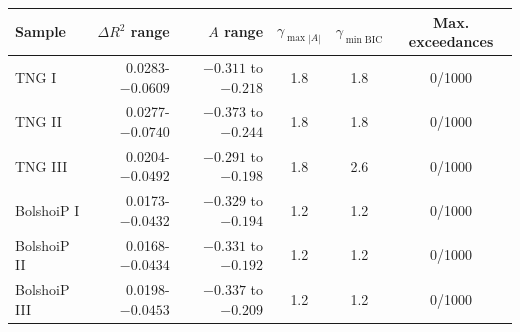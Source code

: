 \begin{tabular}{lrrccc}
\toprule
Sample & $\Delta R^2$ range & $A$ range & $\gamma_{\max|A|}$ & $\gamma_{\min\mathrm{BIC}}$ & Max. exceedances \\
\midrule
TNG I & 0.0283-$-0.0609$ & $-0.311$ to $-0.218$ & 1.8 & 1.8 & 0/1000 \\
TNG II & 0.0277-$-0.0740$ & $-0.373$ to $-0.244$ & 1.8 & 1.8 & 0/1000 \\
TNG III & 0.0204-$-0.0492$ & $-0.291$ to $-0.198$ & 1.8 & 2.6 & 0/1000 \\
BolshoiP I & 0.0173-$-0.0432$ & $-0.329$ to $-0.194$ & 1.2 & 1.2 & 0/1000 \\
BolshoiP II & 0.0168-$-0.0434$ & $-0.331$ to $-0.192$ & 1.2 & 1.2 & 0/1000 \\
BolshoiP III & 0.0198-$-0.0453$ & $-0.337$ to $-0.209$ & 1.2 & 1.2 & 0/1000 \\
\bottomrule
\end{tabular}

